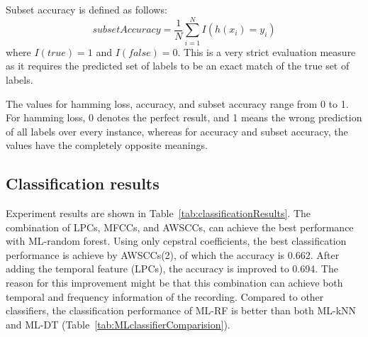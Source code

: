 Subset accuracy is defined as follows:
\begin{equation}
subsetAccuracy = \frac{1}{N}\sum_{i=1}^{N}I(h(x_{i})=y_{i})
\end{equation}
where $I(true)=1$ and $I(false)=0$. This is a very strict evaluation
measure as it requires the predicted set of labels to be an exact
match of the true set of labels.


The values for hamming loss, accuracy, and subset accuracy range from 0 to 1. For hamming loss, 0 denotes the perfect result, and 1 means the wrong prediction of all labels over every instance, whereas for accuracy and subset accuracy, the values have the completely opposite meanings.



\subsection{Classification results}

Experiment results are shown in Table~\ref{tab:classificationResults}. The combination of LPCs, MFCCs, and AWSCCs, can achieve the best performance with ML-random forest. Using only cepstral coefficients, the best classification performance is achieve by AWSCCs(2), of which the accuracy is 0.662. After adding the temporal feature (LPCs), the accuracy is improved to 0.694. The reason for this improvement might be that this combination can achieve both temporal and frequency information of the recording. Compared to other classifiers, the classification performance of ML-RF is better than both ML-kNN and ML-DT (Table~\ref{tab:MLclassifierComparision}).



